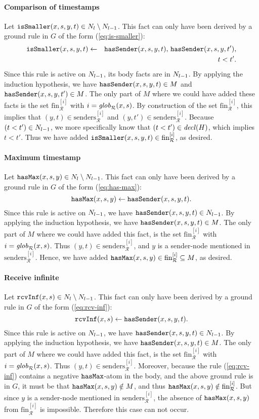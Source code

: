 \documentclass{tlp}
\newcommand{\rcvinf}{\pred{rcvInf}}
\newcommand{\issmaller}{\pred{isSmaller}}
\newcommand{\hasmax}{\pred{hasMax}}
\newcommand{\hassender}{\pred{hasSender}}
\newcommand{\decl}[1]{\fname{decl}(#1)}
\newcommand{\run}{\mathcal{R}}
\newcommand{\globR}[1]{\fname{glob}_{\run}(#1)}
\newcommand{\slicefin}[1]{\text{fin}_{\run}^{[#1]}}
\newcommand{\senders}[1]{\text{senders}_{\run}^{[#1]}}
\newcommand{\grded}{G}
\begin{document}
\begin{appendix}
\paragraph*{Comparison of timestamps}

Let $\issmaller(x,s,y,t)\in\diffN$. This fact can only have been
derived by a ground rule in $\grded$ of the form (\ref{eq:is-smaller}):
\begin{eqnarray*}
\issmaller(x,s,y,t) & \gets & \hassender(x,s,y,t),\,\hassender(x,s,y,t'),\\
 &  & t<t'.
\end{eqnarray*}
Since this rule is active on $N_{l-1}$, its body facts are in $N_{l-1}$.
By applying the induction hypothesis, we have $\hassender(x,s,y,t)\in M$
and $\hassender(x,s,y,t')\in M$. The only part of $M$ where we could
have added these facts is the set $\slicefin i$ with $i=\globR{x,s}$.
By construction of the set $\slicefin i$, this implies that $(y,t)\in\senders i$
and $(y,t')\in\senders i$. Because $(t<t')\in N_{l-1}$, we more specifically
know that $(t<t')\in\decl H$, which implies $t<t'$. Thus we have
added $\issmaller(x,s,y,t)\in\slicefin i$, as desired.


\paragraph*{Maximum timestamp}

Let $\hasmax(x,s,y)\in\diffN$. This fact can only have been derived
by a ground rule in $\grded$ of the form (\ref{eq:has-max}):
\[
\hasmax(x,s,y)\gets\hassender(x,s,y,t).
\]
Since this rule is active on $N_{l-1}$, we have $\hassender(x,s,y,t)\in\prevN$.
By applying the induction hypothesis, we have $\hassender(x,s,y,t)\in M$.
The only part of $M$ where we could have added this fact, is the
set $\slicefin i$ with $i=\globR{x,s}$. Thus $(y,t)\in\senders i$,
and $y$ is a sender-node mentioned in $\senders i$. Hence, we have
added $\hasmax(x,s,y)\in\slicefin i\subseteq M$, as desired.


\paragraph*{Receive infinite}

Let $\rcvinf(x,s)\in\diffN$. This fact can only have been derived
by a ground rule in $\grded$ of the form (\ref{eq:rcv-inf}):
\[
\rcvinf(x,s)\gets\hassender(x,s,y,t).
\]
Since this rule is active on $N_{l-1}$, we have $\hassender(x,s,y,t)\in\prevN$.
By applying the induction hypothesis, we have $\hassender(x,s,y,t)\in M$.
The only part of $M$ where we could have added this fact, is the
set $\slicefin i$ with $i=\globR{x,s}$. Thus $(y,t)\in\senders i$.
Moreover, because the rule (\ref{eq:rcv-inf}) contains a negative
$\hasmax$-atom in the body, and the above ground rule is in $\grded$,
it must be that $\hasmax(x,s,y)\notin M$, and thus $\hasmax(x,s,y)\notin\slicefin i$.
 But since $y$ is a sender-node mentioned in $\senders i$, the
absence of $\hasmax(x,s,y)$ from $\slicefin i$ is impossible. Therefore
this case can not occur.



\end{appendix}
\end{document}
